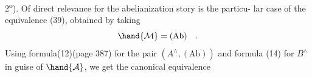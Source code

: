  \hand{(}2\textsuperscript{o}).  Of direct relevance for the abelianization story is the particu-%
lar case of the equivalence (39),  obtained by taking
\[ \hand{\mathcal{M}} = (\mathrm{Ab}) \quad . \]
Using formula(12)(page 387) for the pair $(A^{\wedge},(\mathrm{Ab}))$  and formula (14)
for $B^{\wedge}$ in guise of $\hand{\mathcal{A}}$,  we get  the canonical equivalence

